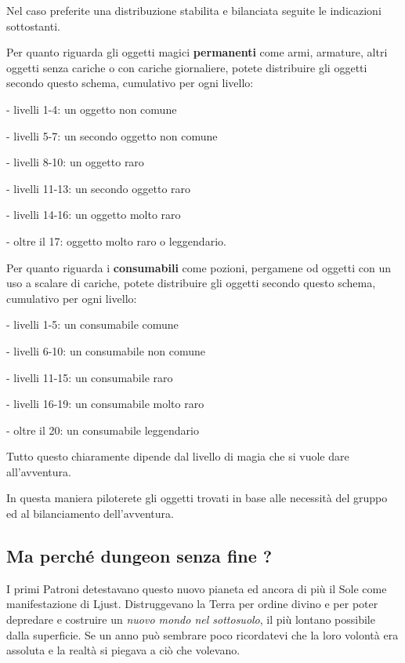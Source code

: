 \begin{multicols}{2}
Nel caso preferite una distribuzione stabilita e bilanciata seguite le indicazioni sottostanti.

Per quanto riguarda gli oggetti magici \textbf{permanenti} come armi, armature, altri oggetti senza cariche o con cariche giornaliere, potete distribuire gli oggetti secondo questo schema, cumulativo per ogni livello:

\medskip

- livelli 1-4: un oggetto non comune

- livelli 5-7: un secondo oggetto non comune

- livelli 8-10: un oggetto raro

- livelli 11-13: un secondo oggetto raro

- livelli 14-16: un oggetto molto raro

- oltre il 17: oggetto molto raro o leggendario.

\medskip

Per quanto riguarda i \textbf{consumabili} come pozioni, pergamene od oggetti con un uso a scalare di cariche, potete distribuire gli oggetti secondo questo schema, cumulativo per ogni livello:

\medskip

- livelli 1-5: un consumabile comune

- livelli 6-10: un consumabile non comune

- livelli 11-15: un consumabile raro

- livelli 16-19: un consumabile molto raro

- oltre il 20: un consumabile leggendario

\medskip

Tutto questo chiaramente dipende dal livello di magia che si vuole dare all'avventura.

In questa maniera piloterete gli oggetti trovati in base alle necessità del gruppo ed al bilanciamento dell'avventura.


\subsection*{Ma perché dungeon senza fine ?}

I primi Patroni detestavano questo nuovo pianeta ed ancora di più il Sole come manifestazione di Ljust.
Distruggevano la Terra per ordine divino e per poter depredare e costruire un \emph{nuovo mondo nel sottosuolo}, il più lontano possibile dalla superficie. Se un anno può sembrare poco ricordatevi che la loro volontà era assoluta e la realtà si piegava a ciò che volevano.


\end{multicols}
